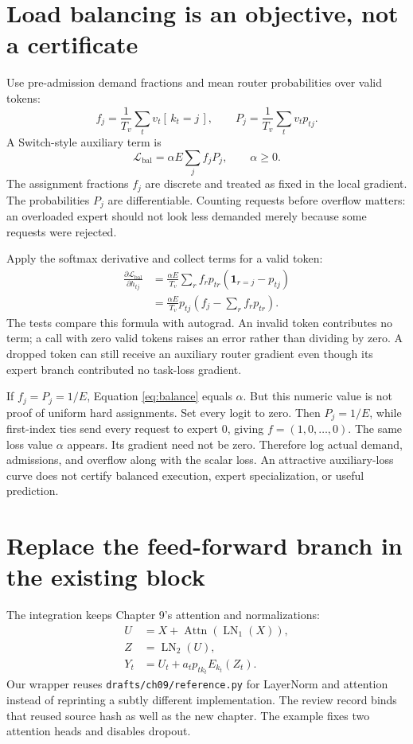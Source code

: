 \section{Load balancing is an objective, not a certificate}
Use pre-admission demand fractions and mean router probabilities over valid
tokens:
\begin{equation}
f_j=\frac{1}{T_v}\sum_t v_t[\,k_t=j\,],\qquad
P_j=\frac{1}{T_v}\sum_t v_t p_{tj}.
\end{equation}
A Switch-style auxiliary term is
\begin{equation}
\mathcal L_{\mathrm{bal}}=\alpha E\sum_j f_jP_j,\qquad \alpha\ge0. \label{eq:balance}
\end{equation}
The assignment fractions $f_j$ are discrete and treated as fixed in the local
gradient. The probabilities $P_j$ are differentiable. Counting requests before
overflow matters: an overloaded expert should not look less demanded merely
because some requests were rejected.

Apply the softmax derivative and collect terms for a valid token:
\begin{align}
\frac{\partial\mathcal L_{\mathrm{bal}}}{\partial h_{tj}}
&=\frac{\alpha E}{T_v}\sum_r f_r p_{tr}
(\mathbf1_{r=j}-p_{tj})\\
&=\frac{\alpha E}{T_v}p_{tj}
\left(f_j-\sum_r f_rp_{tr}\right). \label{eq:balancegrad}
\end{align}
The tests compare this formula with autograd. An invalid token contributes no
term; a call with zero valid tokens raises an error rather than dividing by
zero. A dropped token can still receive an auxiliary router gradient even
though its expert branch contributed no task-loss gradient.

If $f_j=P_j=1/E$, Equation \ref{eq:balance} equals $\alpha$.
But this numeric value is not proof of uniform hard assignments. Set every
logit to zero. Then $P_j=1/E$, while first-index ties send every request to
expert 0, giving $f=(1,0,\ldots,0)$. The same loss value $\alpha$ appears.
Its gradient need not be zero. Therefore log actual demand, admissions, and
overflow along with the scalar loss. An attractive auxiliary-loss curve does
not certify balanced execution, expert specialization, or useful prediction.

\section{Replace the feed-forward branch in the existing block}
The integration keeps Chapter 9's attention and normalizations:
\begin{align}
U&=X+\operatorname{Attn}(\operatorname{LN}_1(X)),\\
Z&=\operatorname{LN}_2(U),\\
Y_t&=U_t+a_t p_{t k_t}E_{k_t}(Z_t).
\end{align}
Our wrapper reuses \texttt{drafts/ch09/reference.py} for LayerNorm and attention
instead of reprinting a subtly different implementation. The review record
binds that reused source hash as well as the new chapter. The example fixes
two attention heads and disables dropout.

